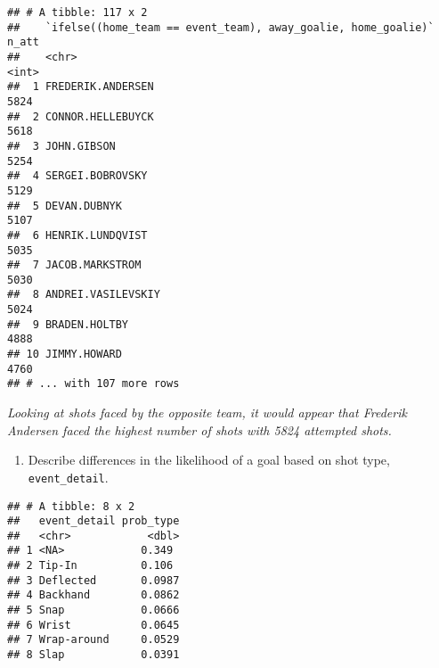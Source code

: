 \documentclass[]{article}
\newenvironment{Shaded}{\begin{snugshade}}{\end{snugshade}}
\newcommand{\DataTypeTok}[1]{\textcolor[rgb]{0.13,0.29,0.53}{#1}}
\newcommand{\KeywordTok}[1]{\textcolor[rgb]{0.13,0.29,0.53}{\textbf{#1}}}
\newcommand{\NormalTok}[1]{#1}
\newcommand{\OperatorTok}[1]{\textcolor[rgb]{0.81,0.36,0.00}{\textbf{#1}}}
\newcommand{\StringTok}[1]{\textcolor[rgb]{0.31,0.60,0.02}{#1}}
\providecommand{\tightlist}{%
  \setlength{\itemsep}{0pt}\setlength{\parskip}{0pt}}
\begin{document}
\begin{verbatim}
## # A tibble: 117 x 2
##    `ifelse((home_team == event_team), away_goalie, home_goalie)` n_att
##    <chr>                                                         <int>
##  1 FREDERIK.ANDERSEN                                              5824
##  2 CONNOR.HELLEBUYCK                                              5618
##  3 JOHN.GIBSON                                                    5254
##  4 SERGEI.BOBROVSKY                                               5129
##  5 DEVAN.DUBNYK                                                   5107
##  6 HENRIK.LUNDQVIST                                               5035
##  7 JACOB.MARKSTROM                                                5030
##  8 ANDREI.VASILEVSKIY                                             5024
##  9 BRADEN.HOLTBY                                                  4888
## 10 JIMMY.HOWARD                                                   4760
## # ... with 107 more rows
\end{verbatim}

\emph{Looking at shots faced by the opposite team, it would appear that
Frederik Andersen faced the highest number of shots with 5824 attempted
shots.}

\begin{enumerate}
\def\labelenumi{\arabic{enumi}.}
\setcounter{enumi}{2}
\tightlist
\item
  Describe differences in the likelihood of a goal based on shot type,
  \texttt{event\_detail}.
\end{enumerate}

\begin{Shaded}
\end{Shaded}

\begin{verbatim}
## # A tibble: 8 x 2
##   event_detail prob_type
##   <chr>            <dbl>
## 1 <NA>            0.349 
## 2 Tip-In          0.106 
## 3 Deflected       0.0987
## 4 Backhand        0.0862
## 5 Snap            0.0666
## 6 Wrist           0.0645
## 7 Wrap-around     0.0529
## 8 Slap            0.0391
\end{verbatim}
\end{document}
